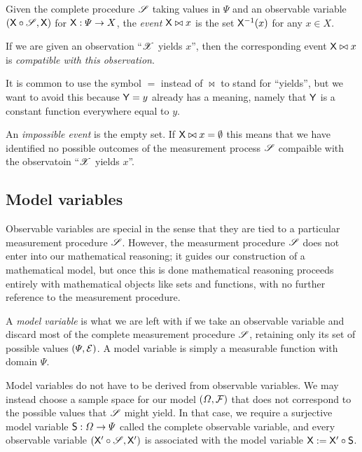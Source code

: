 \begin{definition}[Event]
Given the complete procedure $\mathscr{S}$ taking values in $\Psi$ and an observable variable $(\mathsf{X}\circ \mathscr{S},\mathsf{X})$ for $\mathsf{X}:\Psi\to X$, the \emph{event} $\mathsf{X}\bowtie x$ is the set $\mathsf{X}^{-1}(x)$ for any $x\in X$.
\end{definition}

If we are given an observation ``$\mathscr{X}$ yields $x$'', then the corresponding event $\mathsf{X}\bowtie x$ is \emph{compatible with this observation}.

It is common to use the symbol $=$ instead of $\bowtie$ to stand for ``yields'', but we want to avoid this because $\mathsf{Y}=y$ already has a meaning, namely that $\mathsf{Y}$ is a constant function everywhere equal to $y$.

An \emph{impossible event} is the empty set. If $\mathsf{X}\bowtie x=\emptyset$ this means that we have identified no possible outcomes of the measurement process $\mathscr{S}$ compaible with the observatoin ``$\mathscr{X}$ yields $x$''. 

\subsection{Model variables}

Observable variables are special in the sense that they are tied to a particular measurement procedure $\mathscr{S}$. However, the measurment procedure $\mathscr{S}$ does not enter into our mathematical reasoning; it guides our construction of a mathematical model, but once this is done mathematical reasoning proceeds entirely with mathematical objects like sets and functions, with no further reference to the measurement procedure.

A \emph{model variable} is what we are left with if we take an observable variable and discard most of the complete measurement procedure $\mathscr{S}$, retaining only its set of possible values $(\Psi,\mathcal{E})$. A model variable is simply a measurable function with domain $\Psi$.

Model variables do not have to be derived from observable variables. We may instead choose a sample space for our model $(\Omega,\mathcal{F})$ that does not correspond to the possible values that $\mathscr{S}$ might yield. In that case, we require a surjective model variable $\mathsf{S}:\Omega\to \Psi$ called the complete observable variable, and every observable variable $(\mathsf{X}'\circ \mathscr{S},\mathsf{X}')$ is associated with the model variable $\mathsf{X}:=\mathsf{X}'\circ \mathsf{S}$.

